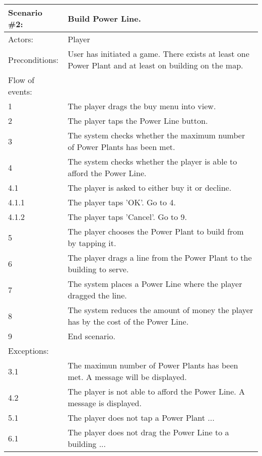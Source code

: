 \begin{tabular}{| l | p{10cm} |}
	\hline
	{\bf Scenario \#2:} & {\bf Build Power Line.} \\ \hline
	Actors: & Player \\ \hline
	Preconditions: & User has initiated a game. There exists at least one Power Plant and at least on building on the map. \\ \hline
	Flow of events: & \\ \hline
	1 & The player drags the buy menu into view. \\ \hline
	2 & The player taps the Power Line button. \\ \hline
	3 & The system checks whether the maximum number of Power Plants has been met. \\ \hline
	4 & The system checks whether the player is able to afford the Power Line. \\ \hline
	4.1 & The player is asked to either buy it or decline. \\ \hline
	4.1.1 & The player taps 'OK'. Go to 4. \\ \hline
	4.1.2 & The player taps 'Cancel'. Go to 9. \\ \hline
	5 & The player chooses the Power Plant to build from by tapping it. \\ \hline
	6 & The player drags a line from the Power Plant to the building to serve. \\ \hline
	7 & The system places a Power Line where the player dragged the line. \\ \hline
	8 & The system reduces the amount of money the player has by the cost of the Power Line. \\ \hline
	9 & End scenario. \\ \hline
	Exceptions: & \\ \hline
	3.1 & The maximun number of Power Plants has been met. A message will be displayed. \\ \hline
	4.2 & The player is not able to afford the Power Line. A message is displayed. \\ \hline
	5.1 & The player does not tap a Power Plant ... \\ \hline
	6.1 & The player does not drag the Power Line to a building ... \\ \hline
\end{tabular}

